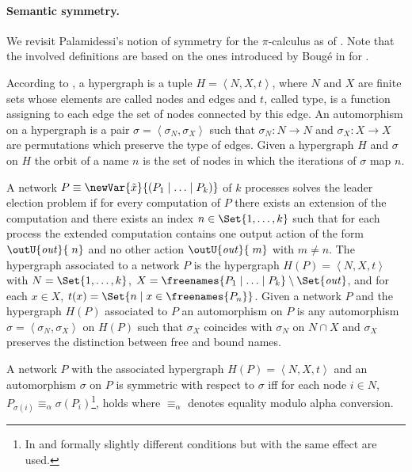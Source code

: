 \documentclass[11pt,techReport]{eptcs}
\begin{document}
\paragraph{Semantic symmetry.}
\label{sec:semantic-symmetry}

We revisit Palamidessi's notion of symmetry for the $ \pi $-calculus as of \cite{palamidessi03}. Note that the involved definitions are based on the ones introduced by Boug\'{e} in \cite{bouge88} for \csp.

According to \cite{palamidessi03}, a hypergraph is a tuple $ H = \left\langle N, X, t \right\rangle $, where $ N $ and $ X $ are finite sets whose elements are called nodes and edges and $ t $, called type, is a function assigning to each edge the set of nodes connected by this edge. An automorphism on a hypergraph is a pair $ \sigma = \left\langle \sigma_N, \sigma_X \right\rangle $ such that $ \sigma_N: N \to N $ and $ \sigma_X: X \to X $ are permutations which preserve the type of edges. Given a hypergraph $ H $ and $ \sigma $ on $ H $ the orbit of a name $ n $ is the set of nodes in which the iterations of $ \sigma $ map $ n $.

A network $ P \equiv \newVar{\tilde{x}}{\left( P_1 \mid \ldots \mid P_k \right)} $ of $ k $ processes solves the leader election problem if for every computation of $ P $ there exists an extension of the computation and there exists an index $ n \in \Set{ 1, \ldots, k } $ such that for each process the extended computation contains one output action of the form $ \outU{\mathit{out}}{\; n} $ and no other action $ \outU{\mathit{out}}{\;m} $ with $ m \neq n $. The hypergraph associated to a network $ P $ is the hypergraph $ H(P) = \left\langle N, X, t \right\rangle $ with $ N = \Set{ 1, \ldots, k } $, $ X = \freenames{P_1 \mid \ldots \mid P_k} \setminus \Set{ \mathit{out} } $, and for each $ x \in X $, $ t(x) = \Set{ n \mid x \in \freenames{P_n} } $. Given a network $ P $ and the hypergraph $ H(P) $ associated to $ P $ an automorphism on $ P $ is any automorphism $ \sigma = \left\langle \sigma_N, \sigma_X \right\rangle $ on $ H(P) $ such that $ \sigma_X $ coincides with $ \sigma_N $ on $ N \cap X $ and $ \sigma_X $ preserves the distinction between free and bound names.

A network $ P $ with the associated hypergraph $ H(P) = \left\langle N, X, t \right\rangle $ and an automorphism $ \sigma $ on $ P $ is symmetric with respect to $ \sigma $ iff for each node $ i \in N $, $ P_{\sigma(i)} \equiv_{\alpha} \sigma\left( P_i \right) $\footnote{In \cite{bouge88} and \cite{vigliottiPhillipsPalamidessi07} formally slightly different conditions but with the same effect are used.}, holds where $ \equiv_{\alpha} $ denotes equality modulo alpha conversion.
\end{document}
